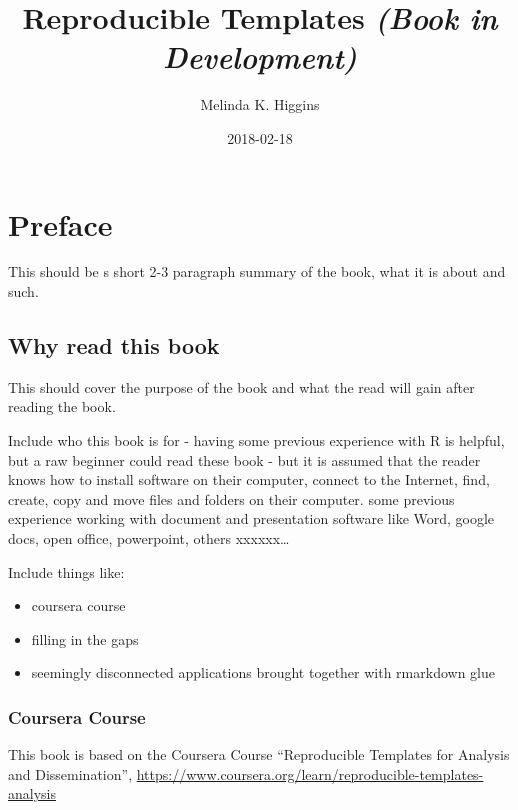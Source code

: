 \documentclass[]{book}
\title{Reproducible Templates \emph{(Book in Development)}}
\author{Melinda K. Higgins}
\date{2018-02-18}
\providecommand{\tightlist}{%
  \setlength{\itemsep}{0pt}\setlength{\parskip}{0pt}}
\theoremstyle{definition}
\theoremstyle{definition}
\theoremstyle{definition}
\theoremstyle{remark}
\begin{document}
\maketitle

{
\setcounter{tocdepth}{1}
\tableofcontents
}
\listoftables
\listoffigures
\chapter*{Preface}\label{preface}

This should be s short 2-3 paragraph summary of the book, what it is
about and such.

\section*{Why read this book}\label{why-read-this-book}

This should cover the purpose of the book and what the read will gain
after reading the book.

Include who this book is for - having some previous experience with R is
helpful, but a raw beginner could read these book - but it is assumed
that the reader knows how to install software on their computer, connect
to the Internet, find, create, copy and move files and folders on their
computer. some previous experience working with document and
presentation software like Word, google docs, open office, powerpoint,
others xxxxxx\ldots{}

Include things like:

\begin{itemize}
\tightlist
\item
  coursera course
\item
  filling in the gaps
\item
  seemingly disconnected applications brought together with rmarkdown
  glue
\end{itemize}

\subsection*{Coursera Course}\label{coursera-course}

This book is based on the Coursera Course ``Reproducible Templates for
Analysis and Dissemination'',
\url{https://www.coursera.org/learn/reproducible-templates-analysis}
\end{document}
